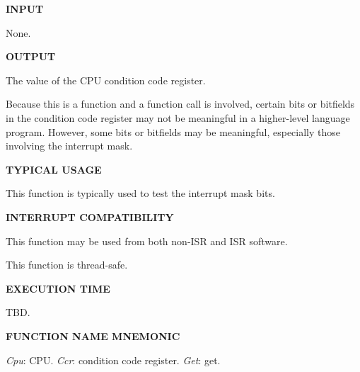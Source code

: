 \noindent\textbf{INPUT}
\begin{list}{}{\setlength{\leftmargin}{0.5in}\setlength{\itemindent}{-0.25in}\setlength{\topsep}{0.0in}\setlength{\partopsep}{0.0in}}
\item None.
\end{list}
\vspace{2.8ex}

\noindent\textbf{OUTPUT}
\begin{list}{}{\setlength{\leftmargin}{0.25in}\setlength{\topsep}{0.0in}}
\item The value of the CPU condition code register.
\item Because this is a function and a function call is involved,
      certain bits or bitfields in the condition code register may not
      be meaningful in a higher-level language program.  However, some
      bits or bitfields may be meaningful, especially those involving
      the interrupt mask.
\end{list}
\vspace{2.8ex}

\noindent\textbf{TYPICAL USAGE}
\begin{list}{}{\setlength{\leftmargin}{0.25in}\setlength{\topsep}{0.0in}}
\item This function is typically used to test the interrupt mask bits.
\end{list}
\vspace{2.8ex}

\noindent\textbf{INTERRUPT COMPATIBILITY}
\begin{list}{}{\setlength{\leftmargin}{0.25in}\setlength{\topsep}{0.0in}}
\item This function may be used from both non-ISR and ISR software.
\item This function is thread-safe.
\end{list}
\vspace{2.8ex}

\noindent\textbf{EXECUTION TIME}
\begin{list}{}{\setlength{\leftmargin}{0.25in}\setlength{\topsep}{0.0in}}
\item TBD.
\end{list}
\vspace{2.8ex}

\noindent\textbf{FUNCTION NAME MNEMONIC}
\begin{list}{}{\setlength{\leftmargin}{0.25in}\setlength{\topsep}{0.0in}}
\item \emph{Cpu}: CPU.  \emph{Ccr}: condition code register.  \emph{Get}: get.
\end{list}


